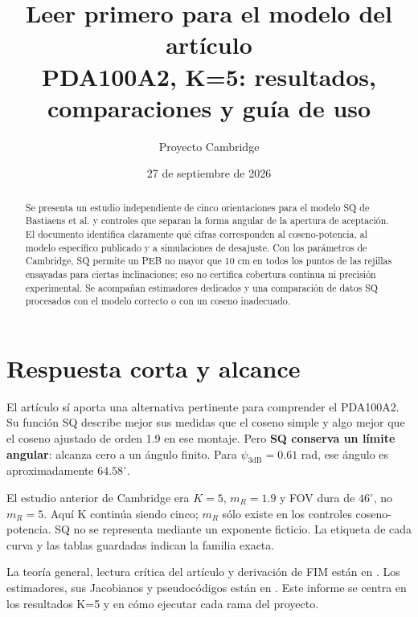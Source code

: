 \documentclass[11pt,a4paper]{article}
\title{Leer primero para el modelo del artículo\\\large PDA100A2, K=5: resultados, comparaciones y guía de uso}
\author{Proyecto Cambridge}
\date{27 de septiembre de 2026}
\begin{document}
\maketitle
\begin{abstract}
Se presenta un estudio independiente de cinco orientaciones para el modelo SQ de Bastiaens et al. y controles que separan la forma angular de la apertura de aceptación. El documento identifica claramente qué cifras corresponden al coseno-potencia, al modelo específico publicado y a simulaciones de desajuste. Con los parámetros de Cambridge, SQ permite un PEB no mayor que 10 cm en todos los puntos de las rejillas ensayadas para ciertas inclinaciones; eso no certifica cobertura continua ni precisión experimental. Se acompañan estimadores dedicados y una comparación de datos SQ procesados con el modelo correcto o con un coseno inadecuado.
\end{abstract}
\tableofcontents

\section{Respuesta corta y alcance}
El artículo \cite{bastiaens2020} sí aporta una alternativa pertinente para comprender el PDA100A2. Su función SQ describe mejor sus medidas que el coseno simple y algo mejor que el coseno ajustado de orden 1.9 en ese montaje. Pero \textbf{SQ conserva un límite angular}: alcanza cero a un ángulo finito. Para $\psi_{3\mathrm{dB}}=0.61$ rad, ese ángulo es aproximadamente $64.58^\circ$.

El estudio anterior de Cambridge era $K=5$, $m_R=1.9$ y FOV dura de $46^\circ$, no $m_R=5$. Aquí K continúa siendo cinco; $m_R$ sólo existe en los controles coseno-potencia. SQ no se representa mediante un exponente ficticio. La etiqueta de cada curva y las tablas guardadas indican la familia exacta.

La teoría general, lectura crítica del artículo y derivación de FIM están en . Los estimadores, sus Jacobianos y pseudocódigos están en . Este informe se centra en los resultados K=5 y en cómo ejecutar cada rama del proyecto.
\end{document}
